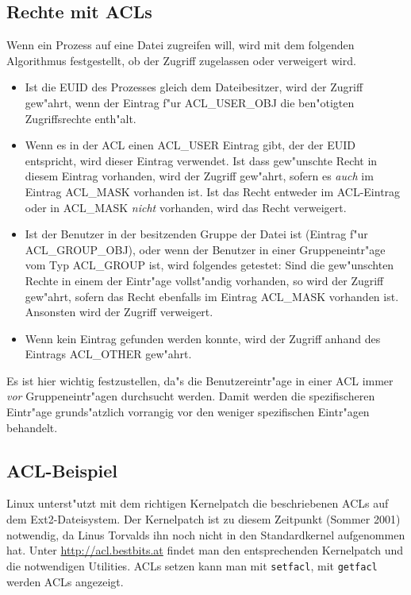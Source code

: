 \documentclass{scrartcl}\usepackage{pslatex}\typearea{12}
\newcommand{\prog}{\texttt}
\begin{document}
\subsection{Rechte mit ACLs}

Wenn ein Prozess auf eine Datei zugreifen will, wird mit dem folgenden
Algorithmus festgestellt, ob der Zugriff zugelassen oder verweigert
wird.

\begin{itemize}
\item Ist die EUID des Prozesses gleich dem Dateibesitzer, wird der
  Zugriff gew"ahrt, wenn der Eintrag f"ur ACL\_USER\_OBJ die
  ben"otigten Zugriffsrechte enth"alt.
\item Wenn es in der ACL einen ACL\_USER Eintrag gibt, der der EUID
  entspricht, wird dieser Eintrag verwendet. Ist dass gew"unschte
  Recht in diesem Eintrag vorhanden, wird der Zugriff gew"ahrt, sofern
  es \emph{auch} im Eintrag ACL\_MASK vorhanden ist. Ist das Recht
  entweder im ACL-Eintrag oder in ACL\_MASK \emph{nicht} vorhanden,
  wird das Recht verweigert.
\item Ist der Benutzer in der besitzenden Gruppe der Datei ist
  (Eintrag f"ur ACL\_GROUP\_OBJ), oder wenn der Benutzer in einer
  Gruppeneintr"age vom Typ ACL\_GROUP ist, wird folgendes getestet:
  Sind die gew"unschten Rechte in einem der Eintr"age vollst"andig
  vorhanden, so wird der Zugriff gew"ahrt, sofern das Recht ebenfalls
  im Eintrag ACL\_MASK vorhanden ist. Ansonsten wird der Zugriff
  verweigert.
\item Wenn kein Eintrag gefunden werden konnte, wird der Zugriff
  anhand des Eintrags ACL\_OTHER gew"ahrt.
\end{itemize}

Es ist hier wichtig festzustellen, da"s die Benutzereintr"age in einer
ACL immer \emph{vor} Gruppeneintr"agen durchsucht werden. Damit werden
die spezifischeren Eintr"age grunds"atzlich vorrangig vor den weniger
spezifischen Eintr"agen behandelt.

\subsection{ACL-Beispiel}

Linux unterst"utzt mit dem richtigen Kernelpatch die beschriebenen
ACLs auf dem Ext2-Dateisystem. Der Kernelpatch ist zu diesem Zeitpunkt
(Sommer 2001) notwendig, da Linus Torvalds ihn noch nicht in den
Standardkernel aufgenommen hat. Unter
\href{http://acl.bestbits.at/}{http://acl.bestbits.at} findet man den
entsprechenden Kernelpatch und die notwendigen Utilities. ACLs setzen
kann man mit \prog{setfacl}, mit \prog{getfacl} werden ACLs angezeigt.
\end{document}
